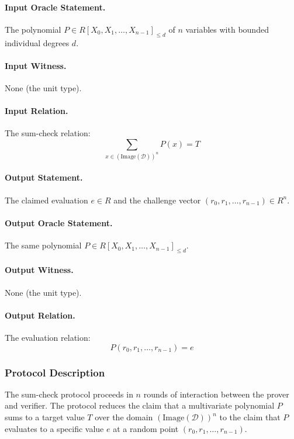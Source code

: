 \paragraph{Input Oracle Statement.} The polynomial $P \in R[X_0, X_1, \ldots, X_{n-1}]_{\leq d}$ of $n$ variables with bounded individual degrees $d$.

\paragraph{Input Witness.} None (the unit type).

\paragraph{Input Relation.} The sum-check relation:
\[
\sum_{x \in (\text{Image}(\mathcal{D}))^n} P(x) = T
\]

\paragraph{Output Statement.} The claimed evaluation $e \in R$ and the challenge vector $(r_0, r_1, \ldots, r_{n-1}) \in R^n$.

\paragraph{Output Oracle Statement.} The same polynomial $P \in R[X_0, X_1, \ldots, X_{n-1}]_{\leq d}$.

\paragraph{Output Witness.} None (the unit type).

\paragraph{Output Relation.} The evaluation relation:
\[
P(r_0, r_1, \ldots, r_{n-1}) = e
\]

\subsubsection{Protocol Description}

The sum-check protocol proceeds in $n$ rounds of interaction between the prover and verifier. The protocol reduces the claim that a multivariate polynomial $P$ sums to a target value $T$ over the domain $(\text{Image}(\mathcal{D}))^n$ to the claim that $P$ evaluates to a specific value $e$ at a random point $(r_0, r_1, \ldots, r_{n-1})$.

